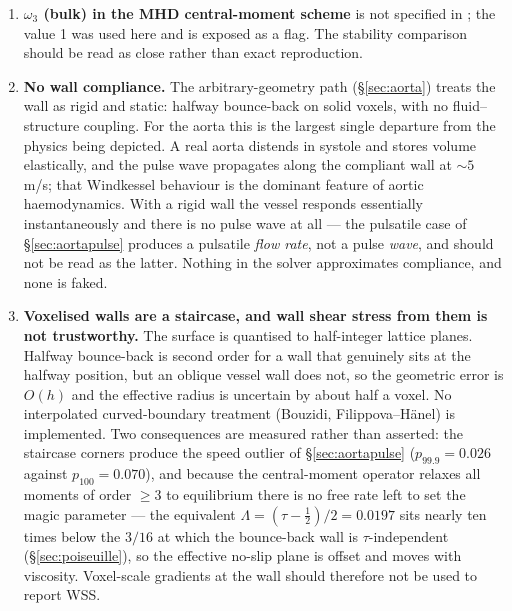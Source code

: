 \documentclass[11pt,a4paper]{article}
\newcommand{\e}[1]{\times 10^{#1}}
\begin{document}
\begin{enumerate}[leftmargin=1.4em,itemsep=4pt]
  Note that the force corrections of \S\ref{sec:regularized} \emph{raise} the
  reported Poiseuille error at $\tau=0.8$, from $9.07\e{-3}$ to $1.71\e{-2}$,
  because the force defect and the curvature slip have opposite signs there and
  were partially cancelling. That cancellation was accidental and
  $\tau$-specific; at $\tau=1$ the corrected condition is exact.

\item \textbf{$\omega_3$ (bulk) in the MHD central-moment scheme} is not specified
  in \cite{derosis2018}; the value 1 was used here and is exposed as a flag. The
  stability comparison should be read as close rather than exact reproduction.

\item \textbf{No wall compliance.} The arbitrary-geometry path
  (\S\ref{sec:aorta}) treats the wall as rigid and static: halfway bounce-back on
  solid voxels, with no fluid--structure coupling. For the aorta this is the
  largest single departure from the physics being depicted. A real aorta
  distends in systole and stores volume elastically, and the pulse wave
  propagates along the compliant wall at ${\sim}5$\,m/s; that Windkessel
  behaviour is the dominant feature of aortic haemodynamics. With a rigid wall
  the vessel responds essentially instantaneously and there is no pulse wave at
  all --- the pulsatile case of \S\ref{sec:aortapulse} produces a pulsatile
  \emph{flow rate}, not a pulse \emph{wave}, and should not be read as the
  latter. Nothing in the solver approximates compliance, and none is faked.

\item \textbf{Voxelised walls are a staircase, and wall shear stress from them
  is not trustworthy.} The surface is quantised to half-integer lattice planes.
  Halfway bounce-back is second order for a wall that genuinely sits at the
  halfway position, but an oblique vessel wall does not, so the geometric error
  is $O(h)$ and the effective radius is uncertain by about half a voxel. No
  interpolated curved-boundary treatment (Bouzidi, Filippova--H\"anel) is
  implemented. Two consequences are measured rather than asserted: the staircase
  corners produce the speed outlier of \S\ref{sec:aortapulse}
  ($p_{99.9}=0.026$ against $p_{100}=0.070$), and because the central-moment
  operator relaxes all moments of order $\ge 3$ to equilibrium there is no free
  rate left to set the magic parameter --- the equivalent
  $\Lambda = (\tau-\tfrac12)/2 = 0.0197$ sits nearly ten times below the $3/16$
  at which the bounce-back wall is $\tau$-independent
  (\S\ref{sec:poiseuille}), so the effective no-slip plane is offset and moves
  with viscosity. Voxel-scale gradients at the wall should therefore not be used
  to report WSS.


\end{enumerate}
\end{document}
